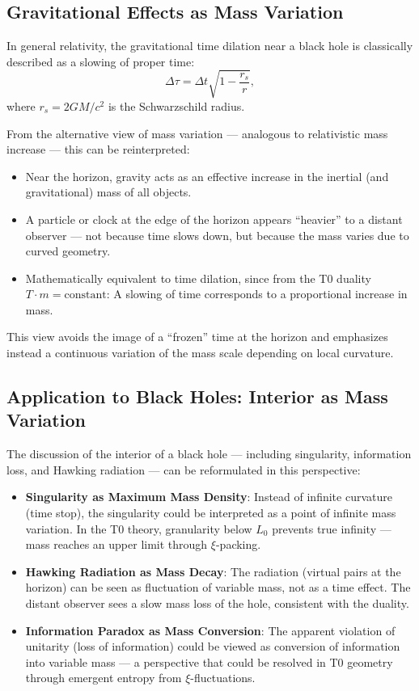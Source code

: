	\subsection{Gravitational Effects as Mass Variation}
	In general relativity, the gravitational time dilation near a black hole is classically described as a slowing of proper time:
	\[
	\Delta \tau = \Delta t \sqrt{1 - \frac{r_s}{r}} ,
	\]
	where $r_s = 2GM/c^2$ is the Schwarzschild radius.
	
	From the alternative view of mass variation --- analogous to relativistic mass increase --- this can be reinterpreted:
	\begin{itemize}
		\item Near the horizon, gravity acts as an effective increase in the inertial (and gravitational) mass of all objects.
		\item A particle or clock at the edge of the horizon appears ``heavier'' to a distant observer --- not because time slows down, but because the mass varies due to curved geometry.
		\item Mathematically equivalent to time dilation, since from the T0 duality $T \cdot m = \text{constant}$: A slowing of time corresponds to a proportional increase in mass.
	\end{itemize}
	
	This view avoids the image of a ``frozen'' time at the horizon and emphasizes instead a continuous variation of the mass scale depending on local curvature.
	
	\subsection{Application to Black Holes: Interior as Mass Variation}
	The discussion of the interior of a black hole --- including singularity, information loss, and Hawking radiation --- can be reformulated in this perspective:
	\begin{itemize}
		\item \textbf{Singularity as Maximum Mass Density}: Instead of infinite curvature (time stop), the singularity could be interpreted as a point of infinite mass variation. In the T0 theory, granularity below $L_0$ prevents true infinity --- mass reaches an upper limit through $\xi$-packing.
		\item \textbf{Hawking Radiation as Mass Decay}: The radiation (virtual pairs at the horizon) can be seen as fluctuation of variable mass, not as a time effect. The distant observer sees a slow mass loss of the hole, consistent with the duality.
		\item \textbf{Information Paradox as Mass Conversion}: The apparent violation of unitarity (loss of information) could be viewed as conversion of information into variable mass --- a perspective that could be resolved in T0 geometry through emergent entropy from $\xi$-fluctuations.
	\end{itemize}
	
